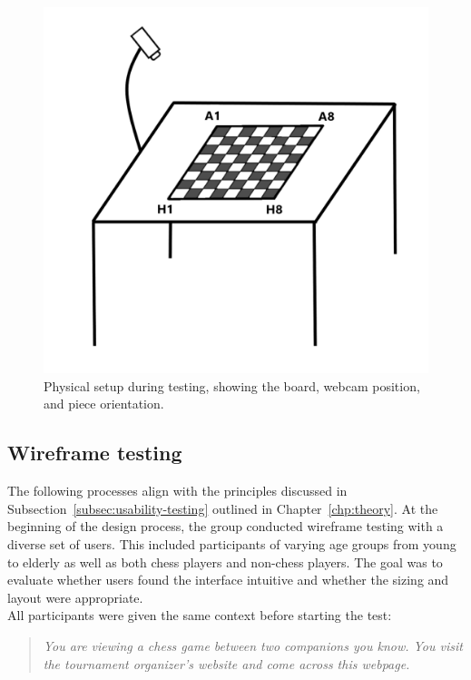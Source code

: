 \begin{figure}[h!]
    \centering
    \includegraphics[width=0.75\linewidth]{figures/methods/testing/setup.png}
    \caption[Setup during testing]{Physical setup during testing, showing the board, webcam position, and piece orientation.}
    \label{fig:setup}
\end{figure}

\newpage



\subsection{Wireframe testing}
\label{subsubsec:user-centered-design}

The following processes align with the principles discussed in  Subsection~\ref{subsec:usability-testing} 
outlined in Chapter~\ref{chp:theory}. At the beginning of the design process, the group conducted wireframe testing with a diverse set of users. This included participants of varying age groups from young to elderly as well as both chess players and non-chess players. The goal was to evaluate whether users found the interface intuitive and whether the sizing and layout were appropriate. \\

All participants were given the same context before starting the test: 

\begin{quote}
\textit{You are viewing a chess game between two companions you know. You visit the tournament organizer's website and come across this webpage.}
\end{quote}

